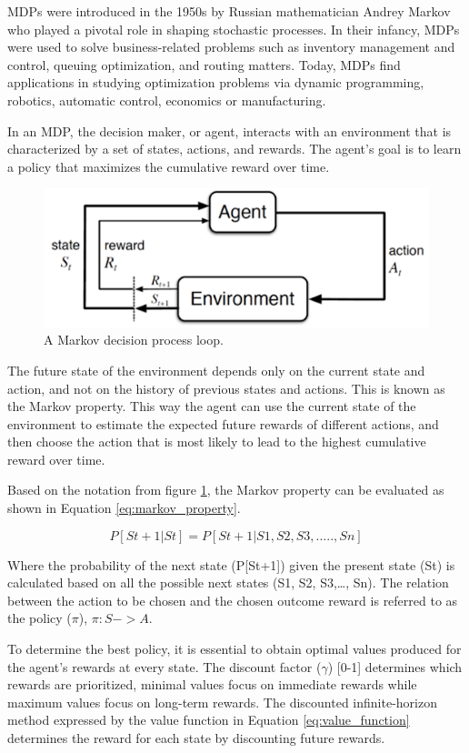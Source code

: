 MDPs were introduced in the 1950s by Russian mathematician Andrey Markov who played a pivotal role in shaping stochastic processes. In their infancy, MDPs were used to solve business-related problems such as inventory management and control, queuing optimization, and routing matters. Today, MDPs find applications in studying optimization problems via dynamic programming, robotics, automatic control, economics or manufacturing.

In an MDP, the decision maker, or agent, interacts with an environment that is characterized by a set of states, actions, and rewards. The agent's goal is to learn a policy that maximizes the cumulative reward over time.

\begin{figure}[!htp]
    \centering
    \includegraphics[width=.6\textwidth]{fig/rl/MDP-model.png}
    \caption{A Markov decision process loop.}
    \label{fig:MDP}
\end{figure}

The future state of the environment depends only on the current state and action, and not on the history of previous states and actions. This is known as the Markov property. This way the agent can use the current state of the environment to estimate the expected future rewards of different actions, and then choose the action that is most likely to lead to the highest cumulative reward over time.

Based on the notation from figure \ref{fig:MDP}, the Markov property can be evaluated as shown in Equation \ref{eq:markov_property}.

\begin{equation}
    \label{eq:markov_property}
    P[St+1|St] = P[St+1|S1,S2,S3,.....,Sn]
\end{equation}

Where the probability of the next state (P[St+1]) given the present state (St) is calculated based on all the possible next states (S1, S2, S3,\dots, Sn).
The relation between the action to be chosen and the chosen outcome reward is referred to as the policy ($\pi$), $\pi: S -> A$.

To determine the best policy, it is essential to obtain optimal values produced for the agent's rewards at every state. The discount factor ($\gamma$) [0-1] determines which rewards are prioritized, minimal values focus on immediate rewards while maximum values focus on long-term rewards. The discounted infinite-horizon method expressed by the value function in Equation \ref{eq:value_function} determines the reward for each state by discounting future rewards.

